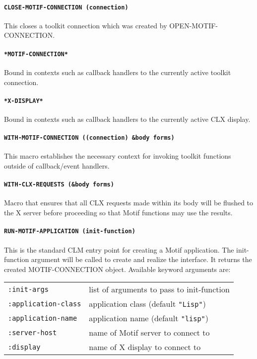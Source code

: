 \documentclass{article}
\begin{document}
\paragraph{\texttt{CLOSE-MOTIF-CONNECTION (connection)}} This closes a toolkit
connection which was created by OPEN-MOTIF-CONNECTION.

\paragraph{\texttt{*MOTIF-CONNECTION*}} Bound in contexts such as
callback handlers to the currently active toolkit connection.

\paragraph{\texttt{*X-DISPLAY*}} Bound in contexts such as callback
handlers to the currently active CLX display.

\paragraph{\texttt{WITH-MOTIF-CONNECTION ((connection) \&body forms)}}
This macro establishes the necessary context for invoking toolkit
functions outside of callback/event handlers.

\paragraph{\texttt{WITH-CLX-REQUESTS (\&body forms)}} Macro that ensures
that all CLX requests made within its body will be flushed to the X
server before proceeding so that Motif functions may use the results.

\paragraph{\texttt{RUN-MOTIF-APPLICATION (init-function)}} This is the
standard CLM entry point for creating a Motif application.  The
init-function argument will be called to create and realize the
interface.  It returns the created MOTIF-CONNECTION object.  Available
keyword arguments are:\\[2mm]
\begin{tabular}{ll}
\texttt{:init-args}		& list of arguments to pass to init-function\\
\texttt{:application-class}	& application class (default \texttt{"Lisp"})\\
\texttt{:application-name}	& application name (default \texttt{"lisp"})\\
\texttt{:server-host}		& name of Motif server to connect to\\
\texttt{:display}		& name of X display to connect to
\end{tabular}
\end{document}

